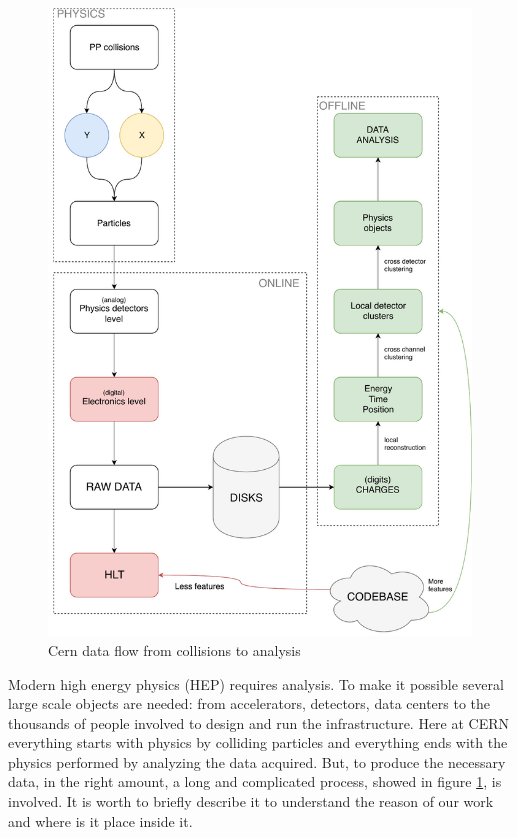 \begin{figure}[ht]
  \includegraphics[height=\textheight]{img/dataflow}
  \caption{Cern data flow from collisions to analysis}
  \label{img:dataflow}
\end{figure}
Modern high energy physics (HEP) requires  analysis. To make it possible several large scale objects are needed: from accelerators, detectors, data centers to the thousands of people involved to design and run the infrastructure. Here at CERN everything starts with physics by colliding particles and everything ends with the physics performed by analyzing the data acquired. But, to produce the necessary data, in the right amount, a long and complicated process, showed in figure \ref{img:dataflow}, is involved. It is worth to briefly describe it to understand the reason of our work and where is it place inside it. \\
